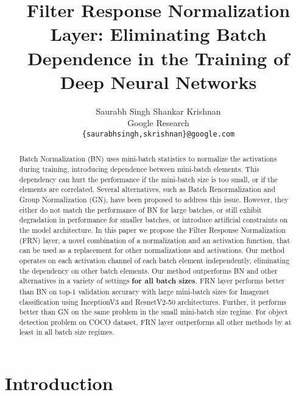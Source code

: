 \documentclass[10pt,twocolumn,letterpaper]{article}
\newcommand{\papername}{FRN}
\begin{document}
\title{Filter Response Normalization Layer: Eliminating Batch Dependence in the Training of Deep Neural Networks}

\author{Saurabh Singh \qquad Shankar Krishnan\\
Google Research\\
{\tt\small \{saurabhsingh,skrishnan\}@google.com}
}

\maketitle

\begin{abstract}
Batch Normalization (BN) uses mini-batch statistics to normalize the activations during training, introducing dependence between mini-batch elements. This dependency can hurt the performance if the mini-batch size is too small, or if the elements are correlated. Several alternatives, such as Batch Renormalization and Group Normalization (GN), have been proposed to address this issue. However, they either do not match the performance of BN for large batches, or still exhibit degradation in performance for smaller batches, or introduce artificial constraints on the model architecture.
In this paper we propose the Filter Response Normalization (\papername{}) layer, a novel combination of a normalization and an activation function, that can be used as a replacement for other normalizations and activations. Our method operates on each activation channel of each batch element independently, eliminating the dependency on other batch elements. Our method outperforms BN and other alternatives in a variety of settings \textbf{for all batch sizes}. \papername{} layer performs  better than BN on top-1 validation accuracy with large mini-batch sizes for Imagenet classification using InceptionV3 and ResnetV2-50 architectures. Further, it performs  better than GN on the same problem in the small mini-batch size regime. For object detection problem on COCO dataset, \papername{} layer outperforms all other methods by at least  in all batch size regimes.

\end{abstract}



\vspace*{-0.1in}
\section{Introduction}
\label{sec:intro}
\end{document}
